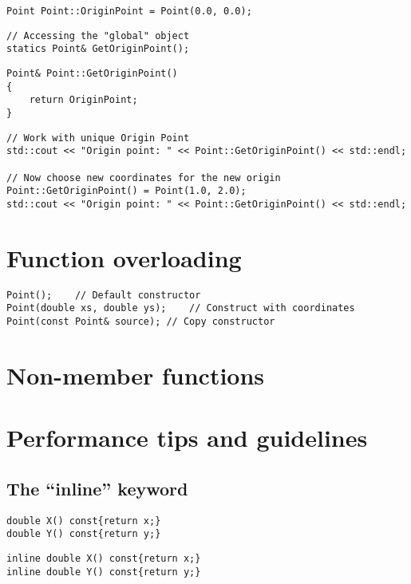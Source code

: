 \begin{lstlisting}
Point Point::OriginPoint = Point(0.0, 0.0);
\end{lstlisting}

\begin{lstlisting}
// Accessing the "global" object
statics Point& GetOriginPoint();
\end{lstlisting}

\begin{lstlisting}
Point& Point::GetOriginPoint()
{
	return OriginPoint;
}
\end{lstlisting}

\begin{lstlisting}
// Work with unique Origin Point
std::cout << "Origin point: " << Point::GetOriginPoint() << std::endl;

// Now choose new coordinates for the new origin
Point::GetOriginPoint() = Point(1.0, 2.0);
std::cout << "Origin point: " << Point::GetOriginPoint() << std::endl;
\end{lstlisting}

\section{Function overloading}

\begin{lstlisting}
Point();	// Default constructor
Point(double xs, double ys);	// Construct with coordinates
Point(const Point& source);	// Copy constructor
\end{lstlisting}

\section{Non-member functions}

\section{Performance tips and guidelines}

\subsection{The ``inline'' keyword}

\begin{lstlisting}
double X() const{return x;}
double Y() const{return y;}
\end{lstlisting}

\begin{lstlisting}
inline double X() const{return x;}
inline double Y() const{return y;}
\end{lstlisting}

